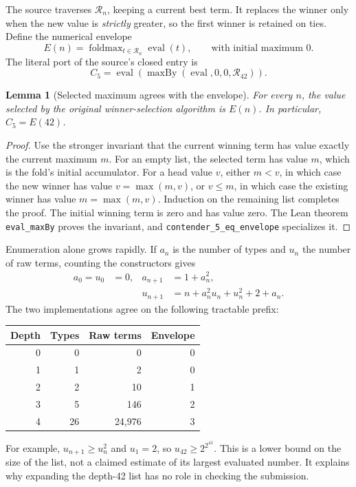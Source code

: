 \documentclass[11pt,letterpaper]{article}
\newtheorem{lemma}[theorem]{Lemma}
\theoremstyle{definition}
\newcommand{\Cfive}{\ensuremath{C_5}}
\newcommand{\eval}{\operatorname{eval}}
\newcommand{\code}[1]{\texttt{#1}}
\begin{document}
The source traverses \(\mathcal R_n\), keeping a current best term. It replaces
the winner only when the new value is \emph{strictly} greater, so the first
winner is retained on ties. Define the numerical envelope
\[
 E(n)=\operatorname{foldmax}_{t\in\mathcal R_n}\eval(t),
 \qquad\text{with initial maximum }0.
\]
The literal port of the source's closed entry is
\[
 \Cfive=\eval(\operatorname{maxBy}(\eval,0,0,\mathcal R_{42})).
\]

\begin{lemma}[Selected maximum agrees with the envelope]
\label{lem:envelope}
For every \(n\), the value selected by the original winner-selection
algorithm is \(E(n)\). In particular, \(\Cfive=E(42)\).
\end{lemma}
\begin{proof}
Use the stronger invariant that the current winning term has value exactly
the current maximum \(m\). For an empty list, the selected term has value
\(m\), which is the fold's initial accumulator. For a head value \(v\), either
\(m<v\), in which case the new winner has value \(v=\max(m,v)\), or
\(v\le m\), in which case the existing winner has value
\(m=\max(m,v)\). Induction on the remaining list completes the proof.
The initial winning term is zero and has value zero. The Lean theorem
\code{eval\_maxBy} proves the invariant, and
\code{contender\_5\_eq\_envelope} specializes it.
\end{proof}

Enumeration alone grows rapidly. If \(a_n\) is the number of types and
\(u_n\) the number of raw terms, counting the constructors gives
\begin{align*}
 a_0=u_0&=0, & a_{n+1}&=1+a_n^2,\\
 &&u_{n+1}&=n+a_n^2u_n+u_n^2+2+a_n.
\end{align*}
The two implementations agree on the following tractable prefix:
\begin{center}
\begin{tabular}{rrrr}
\toprule
Depth & Types & Raw terms & Envelope\\
\midrule
0&0&0&0\\
1&1&2&0\\
2&2&10&1\\
3&5&146&2\\
4&26&24,976&3\\
\bottomrule
\end{tabular}
\end{center}
For example, \(u_{n+1}\ge u_n^2\) and \(u_1=2\), so
\(u_{42}\ge2^{2^{41}}\). This is a lower bound on the size of the list,
not a claimed estimate of its largest evaluated number. It explains why
expanding the depth-42 list has no role in checking the submission.
\end{document}

